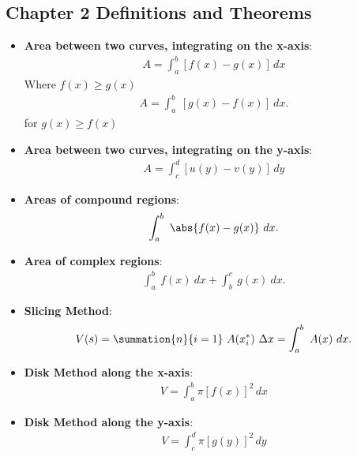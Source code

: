 \documentclass{report}
\begin{document}
    \pagebreak \bigbreak \noindent 
    \subsection{Chapter 2 Definitions and Theorems}
    \bigbreak \noindent 
    \begin{itemize}

        \item \textbf{Area between two curves, integrating on the x-axis}:
            \begin{align}
                A = \int_{a}^{b} [f(x) - g(x)] \, dx
            \end{align}
            Where $f(x) \geq g(x)$
            \begin{align*}
                A = \int_{a}^{b}\ [g(x) - f(x)]\ dx
            .\end{align*}
            for $g(x) \geq f(x)$

        \item \textbf{Area between two curves, integrating on the y-axis}:
            \begin{align}
                A = \int_{c}^{d} [u(y) - v(y)] \, dy
            \end{align}

        \item \textbf{Areas of compound regions}:
            \begin{align*}
                \int_{a}^{b}\ \abs{f(x)-g(x)}\ dx 
            .\end{align*}
        \item \textbf{Area of complex regions}:
            \begin{align*}
                \int_{a}^{b}\ f(x)\ dx + \int_{b}^{c}\ g(x)\ dx
            .\end{align*}
        \item \textbf{Slicing Method}:
            \begin{align*}
                V(s) = \summation{n}{i=1}\ A(x_{i}^{*})\ \Delta x  = \int_{a}^{b}\ A(x)\ dx
            .\end{align*}
        \item \textbf{Disk Method along the x-axis}:
            \begin{align}
                V = \int_{a}^{b} \pi [f(x)]^2 \, dx
            \end{align}

        \item \textbf{Disk Method along the y-axis}:
            \begin{align}
                V = \int_{c}^{d} \pi [g(y)]^2 \, dy
            \end{align}


\end{itemize}
\end{document}
